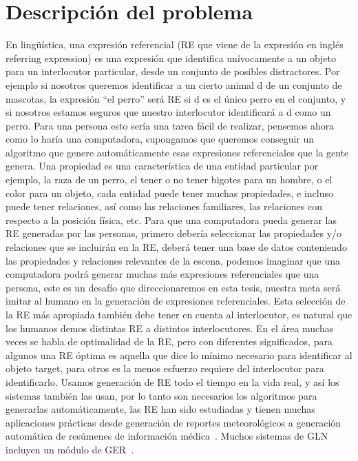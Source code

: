 
\section{Descripci\'on del problema}
\label{sec:intro}

En ling\"u\'{i}stica, una expresi\'on referencial (RE que viene de la expresi\'on en ingl\'es referring expression) es una expresi\'on que identifica un\'ivocamente a un objeto para un interlocutor particular, desde un conjunto de posibles distractores. Por ejemplo si nosotros queremos identificar a un cierto animal d de un conjunto de mascotas, la expresi\'on ``el perro'' ser\'a RE si d es el \'unico perro en el conjunto, y si nosotros estamos seguros que nuestro interlocutor identificar\'a a d como un perro. Para una persona esto ser\'ia una tarea f\'acil de realizar, pensemos ahora como lo har\'ia una computadora, supongamos que queremos conseguir un algoritmo que genere autom\'aticamente esas expresiones referenciales que la gente genera. Una propiedad es una caracter\'istica de una entidad particular por ejemplo, la raza de un perro, el tener o no tener bigotes para un hombre, o el color para un objeto, cada entidad puede tener muchas propiedades, e incluso puede tener relaciones, as\'i como las relaciones familiares, las relaciones con respecto a la posici\'on f\'isica, etc. Para que una computadora pueda generar las RE generadas por las personas, primero deber\'ia seleccionar las propiedades y/o relaciones que se incluir\'an en la RE, deber\'a tener una base de datos conteniendo las propiedades y relaciones relevantes de la escena, podemos imaginar que una computadora podr\'a generar muchas m\'as expresiones referenciales que una persona, este es un desaf\'io que direccionaremos en esta tesis, nuestra meta ser\'a imitar al humano en la generaci\'on de expresiones referenciales. Esta selecci\'on de la RE m\'as apropiada tambi\'en debe tener en cuenta al interlocutor, es natural que los humanos demos distintas RE a distintos interlocutores. En el \'area muchas veces se habla de optimalidad de la RE, pero con diferentes significados, para algunos una RE \'optima es aquella que dice lo m\'inimo necesario para identificar al objeto target, para otros es la menos esfuerzo requiere del interlocutor para identificarlo.
Usamos generaci\'on de RE todo el tiempo en la vida real, y as\'i los sistemas tambi\'en las usan, por lo tanto son necesarios los algoritmos para generarlas autom\'aticamente, las RE han sido estudiadas y tienen muchas aplicaciones pr\'acticas desde generaci\'on de reportes meteorol\'ogicos a generaci\'on autom\'atica de res\'umenes de informaci\'on m\'edica~\cite{dale2000}. Muchos sistemas de GLN incluyen un m\'odulo de GER~\cite{Mellish2004}.
